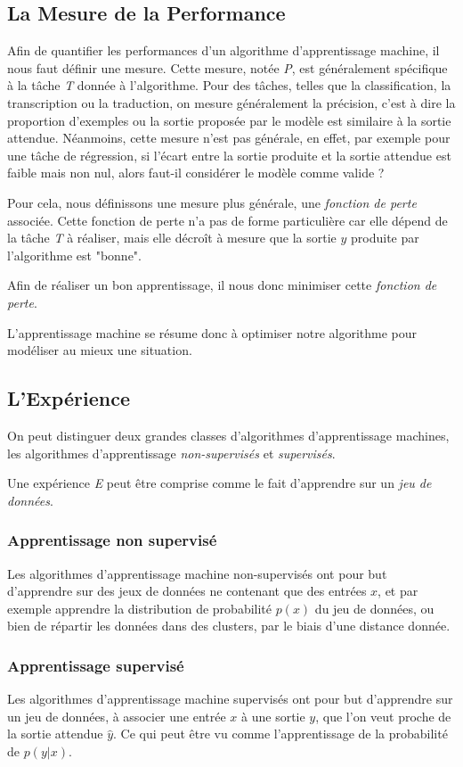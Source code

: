 \documentclass[a4paper, 10pt]{report}
\begin{document}
\subsection{La Mesure de la Performance}
Afin de quantifier les performances d'un algorithme d'apprentissage machine, il nous faut définir une mesure. Cette mesure, notée \emph{P}, est généralement spécifique à la tâche \emph{T} donnée à l'algorithme.
Pour des tâches, telles que la classification, la transcription ou la traduction, on mesure généralement la précision, c'est à dire la proportion d'exemples ou la sortie proposée par le modèle est similaire à la sortie attendue.
Néanmoins, cette mesure n'est pas générale, en effet, par exemple pour une tâche de régression, si l'écart entre la sortie produite et la sortie attendue est faible mais non nul, alors faut-il considérer le modèle comme valide ?

Pour cela, nous définissons une mesure plus générale, une \emph{fonction de perte }associée.
Cette fonction de perte n'a pas de forme particulière car elle dépend de la tâche \emph{T} à réaliser, mais elle décroît à mesure que la sortie $y$ produite par l'algorithme est "bonne".

Afin de réaliser un bon apprentissage, il nous donc minimiser cette \emph{fonction de perte}.

L'apprentissage machine se résume donc à optimiser notre algorithme pour modéliser au mieux une situation.
		
\subsection{L'Expérience}
On peut distinguer deux grandes classes d'algorithmes d'apprentissage machines, les algorithmes d'apprentissage \emph{non-supervisés} et \emph{supervisés}.

Une expérience \emph{E} peut être comprise comme le fait d'apprendre sur un \emph{jeu de données}.
\subsubsection{Apprentissage non supervisé}
Les algorithmes d'apprentissage machine non-supervisés ont pour but d'apprendre sur des jeux de données ne contenant que des entrées $x$, et par exemple apprendre la distribution de probabilité $p(x)$ du jeu de données, ou bien de répartir les données dans des clusters, par le biais d'une distance donnée.
\subsubsection{Apprentissage supervisé}
Les algorithmes d'apprentissage machine supervisés ont pour but d'apprendre sur un jeu de données, à associer une entrée $x$ à une sortie $y$, que l'on veut proche de la sortie attendue $\hat{y}$. Ce qui peut être vu comme l'apprentissage de la probabilité de $p(y|x)$.
	
\end{document}

